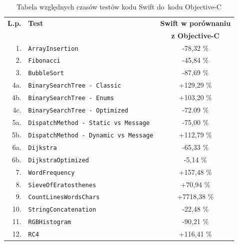 \documentclass[mgr, shortabstract]{iithesis}
\begin{document}
\begin{table}[!ht]
    \begin{tabularx}{1.0\textwidth}{ rXc } 
        \hline
        \textbf{L.p.} & \textbf{Test}  & \textbf{Swift w porównaniu} \\
                      &                & \textbf{z Objective-C}      \\
        \hline
        1. & \texttt{ArrayInsertion}                         & \textcolor{MTGreen}{-78,32 \%}    \\ 
        2. & \texttt{Fibonacci}                              & \textcolor{MTGreen}{-45,84 \%}    \\ 
        3. & \texttt{BubbleSort}                             & \textcolor{MTGreen}{-87,69 \%}    \\ 
        4a. & \texttt{BinarySearchTree - Classic }            & \textcolor{MTRed}{+129,29 \%}     \\ 
        4b. & \texttt{BinarySearchTree - Enums }              & \textcolor{MTRed}{+103,20 \%}     \\ 
        4c. & \texttt{BinarySearchTree - Optimized}           & \textcolor{MTGreen}{-72.09 \%}    \\ 
        5a. & \texttt{DispatchMethod - Static vs Message}     & \textcolor{MTGreen}{-75,00 \%}    \\ 
        5b. & \texttt{DispatchMethod - Dynamic vs Message}    & \textcolor{MTRed}{+112,79 \%}     \\ 
        6a. & \texttt{Dijkstra}                               & \textcolor{MTGreen}{-65,33 \%}    \\ 
        6b. & \texttt{DijkstraOptimized}                      & \textcolor{MTGreen}{-5,14 \%}     \\ 
        7. & \texttt{WordFrequency}                          & \textcolor{MTRed}{+157,48 \%}     \\ 
        8. & \texttt{SieveOfEratosthenes}                    & \textcolor{MTRed}{+70,94 \%}      \\ 
        9. & \texttt{CountLinesWordsChars}                   & \textcolor{MTRed}{+7718,38 \%}    \\ 
        10. & \texttt{StringConcatenation}                    & \textcolor{MTGreen}{-22,48 \%}    \\ 
        11. & \texttt{RGBHistogram}                           & \textcolor{MTGreen}{-90,21 \%}    \\ 
        12. & \texttt{RC4}                                    & \textcolor{MTRed}{+116,41 \%}     \\ 
        \hline
    \end{tabularx}
    \caption{Tabela względnych czasów testów kodu Swift do~kodu Objective-C}
    \label{t:results}
\end{table}
\end{document}
